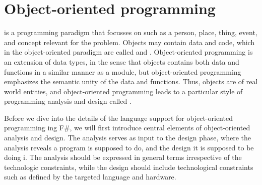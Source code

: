 \chapter{Object-oriented programming}
\label{chap:oop}

 is a programming paradigm that focusses on  such as a person, place, thing, event, and concept relevant for the problem. Objects may contain data and code, which in the object-oriented paradigm are called  and . Object-oriented programming is an extension of data types, in the sense that objects contains both data and functions in a similar manner as a module, but object-oriented programming emphasizes the semantic unity of the data and functions. Thus, objects are  of real world entities, and object-oriented programming leads to a particular style of programming analysis and design called . 

Before we dive into the details of the language support for object-oriented programming ing F\#, we will first introduce central elements of object-oriented analysis and design. The analysis serves as input to the design phase, where the analysis reveals  a program is supposed to do, and the design  it is supposed to be doing i. The analysis should be expressed in general terms irrespective of the technologic constraints, while the design should include technological constraints such as defined by the targeted language and hardware. 

